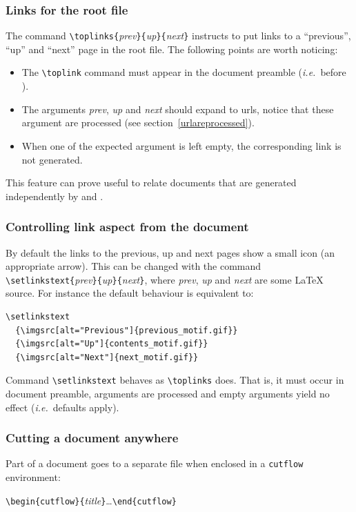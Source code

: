 \subsubsection{Links for the root file}
The command \verb+\toplinks{+\textit{prev}\verb+}{+\textit{up}\verb+}{+\textit{next}\verb+}+ instructs \hacha{}  to put links to a
``previous'', ``up'' and ``next'' page in the root file.
The following points are worth noticing:
\begin{itemize}
\item The \verb+\toplink+ command must appear in the document preamble
(\emph{i.e.}\ before \verb++).
\item The arguments
\textit{prev}, \textit{up} and \textit{next} should expand to urls,
notice that these argument are processed (see section~\ref{urlareprocessed}).
\item When one of the expected argument is left empty,
the corresponding link is not generated.
\end{itemize}
This feature can prove useful to
relate documents that are generated independently by
\hevea{} and \hacha{}.

\subsubsection{Controlling link aspect from the document}
%
By default the links to the previous, up and next pages show a small
icon (an appropriate arrow). This can be changed with the command
\verb+\setlinkstext{+\textit{prev}\verb+}{+\textit{up}\verb+}{+\textit{next}\verb+}+,
where \textit{prev}, \textit{up} and \textit{next} are some \LaTeX{}
source.
For instance the default behaviour is equivalent to:
\begin{verbatim}
\setlinkstext
  {\imgsrc[alt="Previous"]{previous_motif.gif}}
  {\imgsrc[alt="Up"]{contents_motif.gif}}
  {\imgsrc[alt="Next"]{next_motif.gif}}
\end{verbatim}
Command \verb+\setlinkstext+ behaves as \verb+\toplinks+ does.
That is, it must occur in document preamble, arguments are processed
and empty arguments yield no effect (\emph{i.e.}\ defaults apply).

\subsubsection{Cutting a document anywhere}
Part of a document goes to a separate file when enclosed in a
\verb+cutflow+ environment:
\begin{flushleft}
  \verb+\begin{cutflow}{+\textit{title}\verb+}+\ldots\verb+\end{cutflow}+
\end{flushleft}

